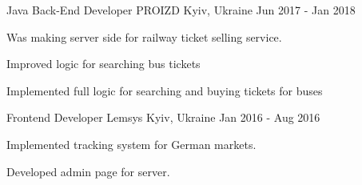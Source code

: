 \begin{cventries}
  \cventry
    {Java Back-End Developer} %
    {PROIZD} %
    {Kyiv, Ukraine} %
    {Jun 2017 - Jan 2018} %
    {
      \begin{cvitems} %
        \item { Was making server side for railway ticket selling service. }
        \item { Improved logic for searching bus tickets }
        \item { Implemented full logic for searching and buying tickets for buses }
      \end{cvitems}
    }
    
  \cventry
    {Frontend Developer} %
    {Lemsys} %
    {Kyiv, Ukraine} %
    {Jan 2016 - Aug 2016} %
    {
      \begin{cvitems} %
        \item { Implemented tracking system for German markets. }
        \item { Developed admin page for server. }
      \end{cvitems}
    }
\end{cventries}
